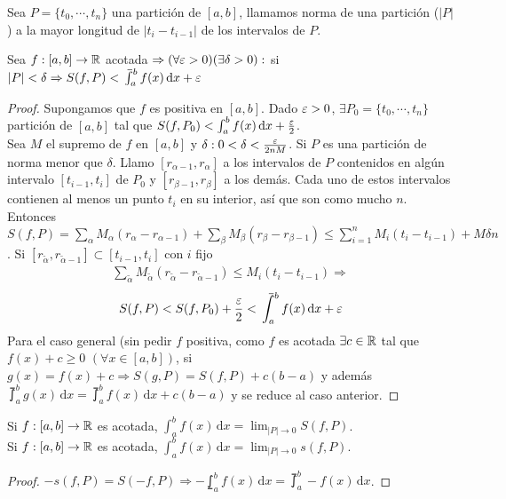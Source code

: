 \begin{definition}
  Sea $P = \{t_0, \cdots, t_n\}$ una partición de $[a, b]$, llamamos norma de una partición ($|P|$) a la mayor longitud de $|t_i - t_{i-1}|$  de los intervalos de $P$.
\end{definition}

\begin{theorem}
  Sea $f: [a, b] \to \mathbb{R}$ acotada $\Rightarrow (\forall \varepsilon > 0)(\exists \delta > 0) : $ si $|P| < \delta \Rightarrow S(f, P) < \upint_a^b f(x) \, \mathrm{d}x + \e$
  \begin{proof}
    Supongamos que $f$ es positiva en $[a, b]$. Dado $\varepsilon > 0$, $\exists P_0 = \{t_0, \cdots, t_n\}$ partición de $[a, b]$ tal que $S(f, P_0) < \int_a^b f(x) \, \mathrm{d}x + \frac{\varepsilon}{2}$. \\
    Sea $M$ el supremo de $f$ en $[a, b]$ y $\delta : 0 < \delta < \frac{\varepsilon}{2nM}$. Si $P$ es una partición de norma menor que $\delta$. Llamo $[r_{\alpha - 1}, r_{\alpha}]$ a los intervalos de $P$ contenidos en algún intervalo $[t_{i-1}, t_i]$ de $P_0$ y $[r_{\beta - 1}, r_{\beta}]$ a los demás. Cada uno de estos intervalos contienen al menos un punto $t_i$ en su interior, así que son como mucho $n$. Entonces $S(f, P) = \sum_{\alpha} M_{\alpha} (r_{\alpha} - r_{\alpha - 1}) + \sum_{\beta} M_{\beta} (r_{\beta} - r_{\beta - 1}) \leq \sum_{i = 1}^n M_i (t_i - t_{i-1}) + M \delta n$.
    Si $[r_{\tilde{\alpha}}, r_{\tilde{\alpha}-1}] \subset [t_{i-1}, t_i]$ con $i$ fijo \begin{align*}
      \sum_{\tilde{\alpha}} M_{\tilde{\alpha}} (r_{\tilde{\alpha}} - r_{\tilde{\alpha}-1}) \leq M_i (t_i - t_{i-1}) \Rightarrow
    \end{align*}
    \begin{align*}
      S(f, P) < S(f, P_0) + \frac{\e}{2} < \upint_a^b f(x) \, \mathrm{d}x + \e
    \end{align*}
    Para el caso general (sin pedir $f$ positiva, como $f$ es acotada $\exists c \in \mathbb{R}$ tal que $f(x) + c \geq 0$ $(\forall x \in [a, b])$, si $g(x) = f(x) + c \Rightarrow S(g, P) = S(f, P) + c (b-a)$ y además $\upint_a^b g(x) \, \mathrm{d}x = \upint_a^b f(x) \, \mathrm{d}x + c (b-a)$ y se reduce al caso anterior.
  \end{proof}
\end{theorem}


\begin{corollary}
  Si $f: [a, b] \to \mathbb{R}$ es acotada, $\int_a^b f(x) \, \mathrm{d}x = \lim_{|P| \to 0} S(f, P)$. \\
  Si $f: [a, b] \to \mathbb{R}$ es acotada, $\int_a^b f(x) \, \mathrm{d}x = \lim_{|P| \to 0} s(f, P)$.
  \begin{proof}
    $-s(f, P) = S(-f, P) \Rightarrow - \lowint_a^b f(x)\, \mathrm{d}x = \upint_a^b -f(x) \, \mathrm{d}x$.
  \end{proof}
\end{corollary}

